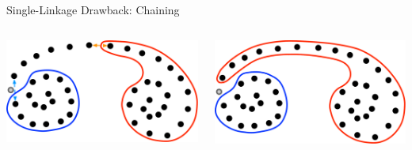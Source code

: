 \documentclass[aspectratio=169]{beamer}
\begin{document}
\begin{frame}{Single-Linkage Drawback: Chaining}

\begin{columns}
\begin{column}{0.5\textwidth}
\includegraphics[width=1\textwidth]{./lectUL/singleLink1.pdf}
\end{column}
\begin{column}{0.5\textwidth}
\includegraphics[width=1\textwidth]{./lectUL/singleLink2.pdf}
\end{column}
\end{columns}
\end{frame}
\end{document}
